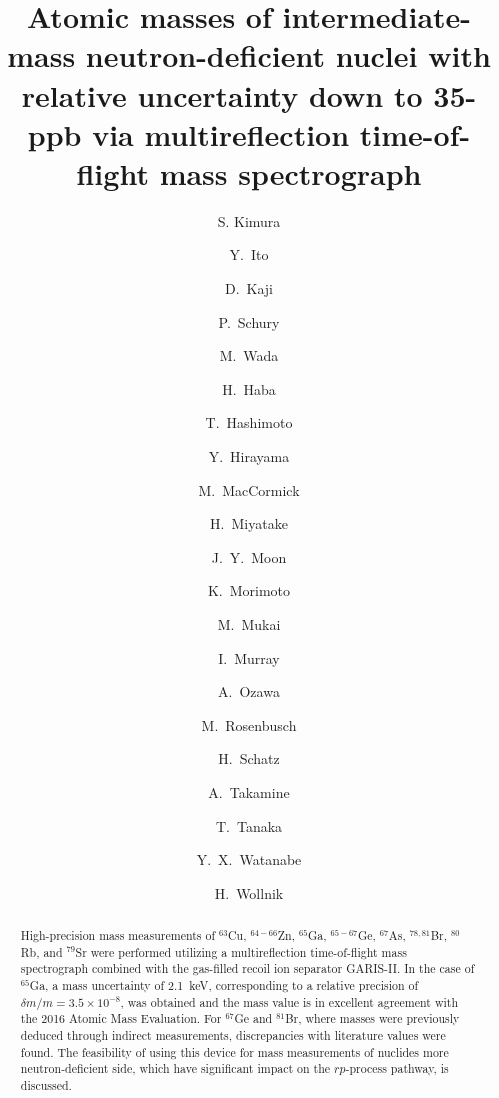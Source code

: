 \documentclass[3p]{elsarticle}
\begin{document}
\begin{frontmatter}

\title{Atomic masses of intermediate-mass neutron-deficient nuclei with \\  relative uncertainty down to 35-ppb via multireflection time-of-flight mass spectrograph}

\author[tsukuba,riken]{S. Kimura}

\author[riken]{Y.~Ito}
\author[riken]{D.~Kaji}
\author[kek]{P.~Schury}
\author[kek,riken]{M.~Wada}
\author[riken]{H.~Haba}
\author[ibs]{T.~Hashimoto}
\author[kek]{Y.~Hirayama}
\author[in2p3]{M.~MacCormick}
\author[kek]{H.~Miyatake}
\author[ibs]{J.~Y.~Moon}
\author[riken]{K.~Morimoto}
\author[tsukuba,riken,kek]{M.~Mukai}
\author[in2p3]{I.~Murray}
\author[tsukuba]{A.~Ozawa}
\author[riken]{M.~Rosenbusch}
\author[msu]{H.~Schatz}
\author[riken]{A.~Takamine}
\author[riken,kyusyu]{T.~Tanaka}
\author[kek]{Y.~X.~Watanabe}
\author[nmsu]{H.~Wollnik}

\address[tsukuba]{Department of Physics, University of Tsukuba, Ibaraki 305-8577, Japan}
\address[riken]{Nishina Center for Accelerator Based Science, RIKEN, Saitama, 351-0198, Japan}
\address[kek]{Wako Nuclear Science Center (WNSC), Institute of Particle and Nuclear Studies (IPNS), \\ High Energy Accelerator Research Organization(KEK), Saitama, 351-0198, Japan}
\address[ibs]{Rare Isotope Science Project (RISP), Institute of Basic Science (IBS), Daejeon 305-811 Korea}
\address[in2p3]{Institut de Physique Nucl$\acute{e}$aire, IN2P3-CNRS, Universit$\acute{e}$ Paris-Sud, Universit$\acute{e}$ Paris-Saclay, 91406 Orsay Cedex, France}
\address[msu]{Department of Physics and Astronomy and National Superconducting Cyclotron Laboratory, Michigan State University, East Lansing, Michigan 48824 USA}
\address[kyusyu]{Department of Physics, Kyushu University, Hakozaki, Higashi-ku, Fukuoka 812-8581, Japan}
\address[nmsu]{New Mexico State University, Las Cruces, New Mexico 88001, USA}



\begin{abstract}
High-precision  mass measurements of $^{63}$Cu, $^{64-66}$Zn, $^{65}$Ga, $^{65-67}$Ge, $^{67}$As, $^{78,81}$Br, $^{80}$Rb, and $^{79}$Sr  were performed utilizing a multireflection time-of-flight mass spectrograph combined with the gas-filled recoil ion separator GARIS-II. In the case of $^{65}$Ga, a mass uncertainty of 2.1~keV, corresponding to a relative precision of $\delta m / m = 3.5\times10^{-8}$, was obtained and the mass value is in excellent agreement with the 2016 Atomic Mass Evaluation.  For $^{67}$Ge and $^{81}$Br, where masses were previously deduced through indirect measurements, discrepancies with literature values were found.  The feasibility of using this device for mass measurements of nuclides more neutron-deficient side, which have significant impact on the $rp$-process pathway, is discussed.
\end{abstract}


\end{frontmatter}
\end{document}
